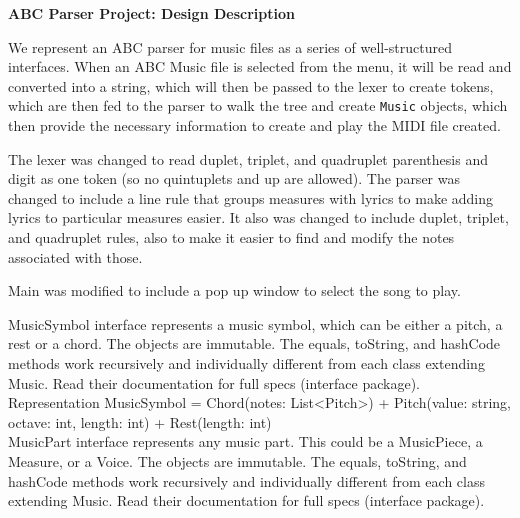 \documentclass[12pt]{book}
\begin{document}
\phantom{xxx}
\bigskip
\centerline{{\large \bf ABC Parser Project: Design Description }}
\bigskip\bigskip


We represent an ABC parser for music files as a series of well-structured interfaces. When an ABC Music file is selected from the menu, it will be read and converted into a string, which will then be passed to the lexer to create tokens, which are then fed to the parser to walk the tree and create {\tt Music} objects, which then provide the necessary information to create and play the MIDI file created.


The lexer was changed to read duplet, triplet, and quadruplet parenthesis and digit as one token (so no quintuplets and up are allowed). The parser was changed to include a line rule that groups measures with lyrics to make adding lyrics to particular measures easier. It also was changed to include duplet, triplet, and quadruplet rules, also to make it easier to find and modify the notes associated with those.

Main was modified to include a pop up window to select the song to play.

\bigskip
{}

MusicSymbol interface represents a music symbol, which can be either a pitch, a rest or a chord. The objects are immutable. The equals, toString, and hashCode methods work recursively and individually different from each class extending Music. Read their documentation for full specs (interface package). \\

Representation MusicSymbol = Chord(notes: List<Pitch>) + Pitch(value: string, octave: int, length: int) + Rest(length: int) \\

MusicPart interface represents any music part. This could be a MusicPiece, a Measure, or a Voice. The objects are immutable. The equals, toString, and hashCode methods work recursively and individually different from each class extending Music. Read their documentation for full specs (interface package). \\ 
\end{document}
